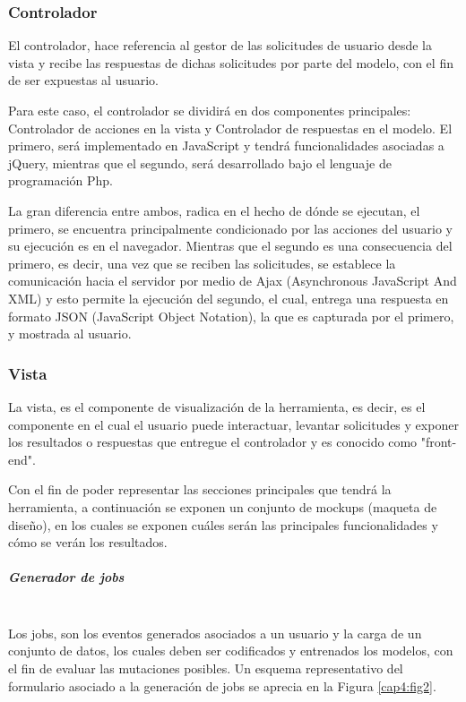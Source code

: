 \subsubsection{Controlador}

El controlador, hace referencia al gestor de las solicitudes de usuario desde la vista y recibe las respuestas de dichas solicitudes por parte del modelo, con el fin de ser expuestas al usuario. 

Para este caso, el controlador se dividirá en dos componentes principales: Controlador de acciones en la vista y Controlador de respuestas en el modelo. El primero, será implementado en JavaScript y tendrá funcionalidades asociadas a jQuery, mientras que el segundo, será desarrollado bajo el lenguaje de programación Php. 

La gran diferencia entre ambos, radica en el hecho de dónde se ejecutan, el primero, se encuentra principalmente condicionado por las acciones del usuario y su ejecución es en el navegador. Mientras que el segundo es una consecuencia del primero, es decir, una vez que se reciben las solicitudes, se establece la comunicación hacia el servidor por medio de Ajax (Asynchronous JavaScript And XML) y esto permite la ejecución del segundo, el cual, entrega una respuesta en formato JSON (JavaScript Object Notation), la que es capturada por el primero, y mostrada al usuario.

\subsubsection{Vista}

La vista, es el componente de visualización de la herramienta, es decir, es el componente en el cual el usuario puede interactuar, levantar solicitudes y exponer los resultados o respuestas que entregue el controlador y es conocido como "front-end".

Con el fin de poder representar las secciones principales que tendrá la herramienta, a continuación se exponen un conjunto de mockups (maqueta de diseño), en los cuales se exponen cuáles serán las principales funcionalidades y cómo se verán los resultados.

\subparagraph{Generador de jobs\\\\}

Los jobs, son los eventos generados asociados a un usuario y la carga de un conjunto de datos, los cuales deben ser codificados y entrenados los modelos, con el fin de evaluar las mutaciones posibles. Un esquema representativo del formulario asociado a la generación de jobs se aprecia en la Figura \ref{cap4:fig2}.

